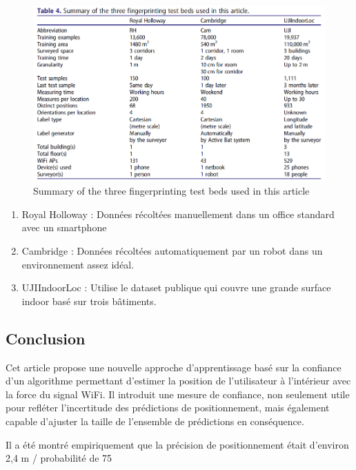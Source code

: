 \begin{figure}[H]
	\begin{center}
		\includegraphics[scale=0.5]{figures/TestBed.png}
		\caption{Summary of the three fingerprinting test beds used in this article}
		\label{fig:TestBed} %
	\end{center}
\end{figure}


\begin{enumerate}
	\item Royal Holloway : Données récoltées manuellement dans un office standard avec un smartphone
	\item Cambridge : Données récoltées automatiquement par un robot dans un environnement assez idéal.
	\item UJIIndoorLoc : Utilise le dataset publique qui couvre une grande surface indoor basé sur trois bâtiments.
\end{enumerate}



\subsection{Conclusion}

Cet article propose une nouvelle approche d'apprentissage basé sur la confiance d'un algorithme permettant d'estimer la position de l'utilisateur à l'intérieur avec la force du signal WiFi. Il introduit une mesure de confiance, non seulement utile pour refléter l'incertitude des prédictions de positionnement, mais également capable d'ajuster la taille de l'ensemble de prédictions en conséquence. 

Il a été montré empiriquement que la précision de positionnement était d’environ 2,4 m / probabilité de 75%

